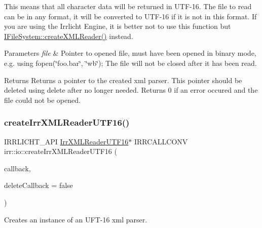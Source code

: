 This means that all character data will be returned in U\+T\+F-\/16. The file to read can be in any format, it will be converted to U\+T\+F-\/16 if it is not in this format. If you are using the Irrlicht Engine, it is better not to use this function but \hyperlink{classirr_1_1io_1_1IFileSystem_a167c9fa159d16ee5c56c074636b0865e}{I\+File\+System\+::create\+X\+M\+L\+Reader()} instead. 
\begin{DoxyParams}{Parameters}
{\em file} & Pointer to opened file, must have been opened in binary mode, e.\+g. using fopen(\char`\"{}foo.\+bar\char`\"{}, \char`\"{}wb\char`\"{}); The file will not be closed after it has been read. \\
\hline
\end{DoxyParams}
\begin{DoxyReturn}{Returns}
Returns a pointer to the created xml parser. This pointer should be deleted using \textquotesingle{}delete\textquotesingle{} after no longer needed. Returns 0 if an error occured and the file could not be opened. 
\end{DoxyReturn}
\mbox{\label{namespaceirr_1_1io_a9248bcaf5d5f394d7926c28bfc479d6c}} 
\subsubsection{\texorpdfstring{create\+Irr\+X\+M\+L\+Reader\+U\+T\+F16()}{createIrrXMLReaderUTF16()}\hspace{0.1cm}{\footnotesize\ttfamily [3/3]}}
{\footnotesize\ttfamily I\+R\+R\+L\+I\+C\+H\+T\+\_\+\+A\+PI \hyperlink{namespaceirr_1_1io_a5eb4094dfd0d509e0cd8a9d1dd30a5b9}{Irr\+X\+M\+L\+Reader\+U\+T\+F16}$\ast$ I\+R\+R\+C\+A\+L\+L\+C\+O\+NV irr\+::io\+::create\+Irr\+X\+M\+L\+Reader\+U\+T\+F16 (\begin{DoxyParamCaption}\item[{\hyperlink{classirr_1_1io_1_1IFileReadCallBack}{I\+File\+Read\+Call\+Back} $\ast$}]{callback,  }\item[{bool}]{delete\+Callback = {\ttfamily false} }\end{DoxyParamCaption})}



Creates an instance of an U\+F\+T-\/16 xml parser. 

